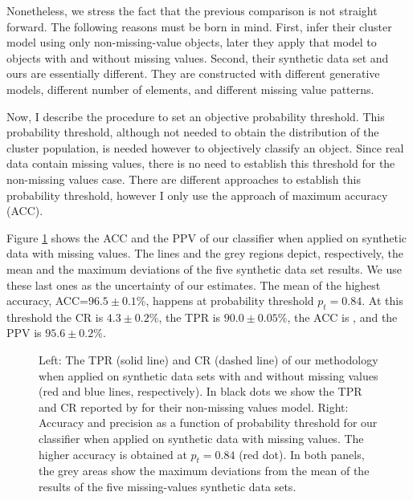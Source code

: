 Nonetheless, we stress the fact that the previous comparison is not straight forward. The following reasons must be born in mind. First, \citet{Sarro2014} infer their cluster model using only non-missing-value objects, later they apply that model to objects with and without missing values. Second, their synthetic data set and ours are essentially different. They are constructed with different generative models, different number of elements, and different missing value patterns. 

Now, I describe the procedure to set an objective probability threshold. This probability threshold, although not needed to obtain the distribution of the cluster population, is needed however to objectively classify an object. Since real data contain missing values, there is no need to establish this threshold for the non-missing values case. There are different approaches to establish this probability threshold, however I only use the approach of maximum accuracy (ACC). 

Figure \ref{fig:tfpr} shows the ACC and the PPV of our classifier when applied on synthetic data with missing values. The lines and the grey regions depict, respectively, the mean and the maximum deviations of the five synthetic data set results. We use these last ones as the uncertainty of our estimates. The mean of the highest accuracy, ACC=$96.5\pm0.1$\%, happens at probability threshold $p_t = 0.84$. At this threshold the CR is $4.3\pm0.2$\%, the TPR is $90.0\pm0.05$\%, the ACC is , and the PPV is $95.6\pm0.2$\%. 

\begin{figure}[!htp]
\begin{center}
\caption{Left: The TPR (solid line) and CR (dashed line) of our methodology  when applied on synthetic data sets with and without missing values (red and blue lines, respectively). In black dots we show the TPR and CR reported by \citet{Sarro2014} for their non-missing values model. Right: Accuracy and precision as a function of probability threshold for our classifier when applied on synthetic data with missing values. The higher accuracy is obtained at $p_t=0.84$ (red dot). In both panels, the grey areas show the maximum deviations from the mean of the results of the five missing-values synthetic data sets.}
\label{fig:tfpr}
\end{center}
\end{figure}

